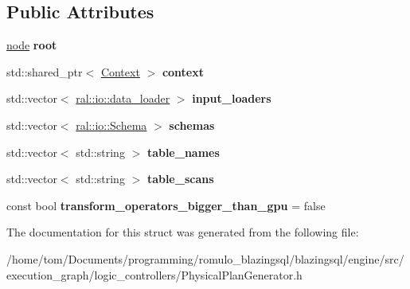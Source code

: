 \subsection*{Public Attributes}
\begin{DoxyCompactItemize}
\item 
\mbox{\label{structral_1_1batch_1_1tree__processor_a38c2010979cc4c09e6ab57e0b8cf9a3b}} 
\hyperlink{structral_1_1batch_1_1node}{node} {\bfseries root}
\item 
\mbox{\label{structral_1_1batch_1_1tree__processor_a2d1624b6ca76bb66d5ce052037498d30}} 
std\+::shared\+\_\+ptr$<$ \hyperlink{classblazingdb_1_1manager_1_1Context}{Context} $>$ {\bfseries context}
\item 
\mbox{\label{structral_1_1batch_1_1tree__processor_afd6296fcae67c2f0e4e9514204e47e74}} 
std\+::vector$<$ \hyperlink{classral_1_1io_1_1data__loader}{ral\+::io\+::data\+\_\+loader} $>$ {\bfseries input\+\_\+loaders}
\item 
\mbox{\label{structral_1_1batch_1_1tree__processor_a7632a35857e3fad6693eab43ea07a299}} 
std\+::vector$<$ \hyperlink{classral_1_1io_1_1Schema}{ral\+::io\+::\+Schema} $>$ {\bfseries schemas}
\item 
\mbox{\label{structral_1_1batch_1_1tree__processor_aab2b3310b02c1ebba7006282c3d847cf}} 
std\+::vector$<$ std\+::string $>$ {\bfseries table\+\_\+names}
\item 
\mbox{\label{structral_1_1batch_1_1tree__processor_a3824095215e25aef4488dc5d99bc8605}} 
std\+::vector$<$ std\+::string $>$ {\bfseries table\+\_\+scans}
\item 
\mbox{\label{structral_1_1batch_1_1tree__processor_a347b4fc1d2dae6c27261bbc0d4e28347}} 
const bool {\bfseries transform\+\_\+operators\+\_\+bigger\+\_\+than\+\_\+gpu} = false
\end{DoxyCompactItemize}


The documentation for this struct was generated from the following file\+:\begin{DoxyCompactItemize}
\item 
/home/tom/\+Documents/programming/romulo\+\_\+blazingsql/blazingsql/engine/src/execution\+\_\+graph/logic\+\_\+controllers/Physical\+Plan\+Generator.\+h\end{DoxyCompactItemize}
